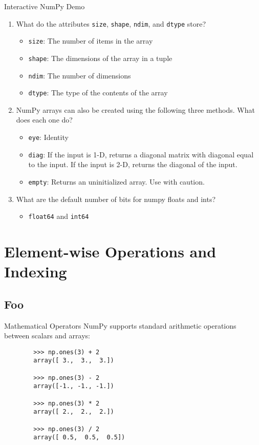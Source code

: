 \documentclass[serif,xcolor=pdftex,dvipsnames,table,hyperref={bookmarks=false,breaklinks}]{beamer}
\begin{document}
\begin{frame}[t,fragile]{Interactive NumPy Demo}
	\begin{enumerate}[<+->]
		\item What do the attributes \verb|size|, \verb|shape|, \verb|ndim|, and \verb|dtype| store?
		\begin{itemize}[<+->]
			\item \verb|size|: The number of items in the array
			\item \verb|shape|: The dimensions of the array in a tuple
			\item \verb|ndim|: The number of dimensions
			\item \verb|dtype|: The type of the contents of the array
		\end{itemize}
		\item NumPy arrays can also be created using the following three methods. What does each one do?
		\begin{itemize}[<+->]
			\item \verb|eye|: Identity
			\item \verb|diag|: If the input is 1-D, returns a diagonal matrix with diagonal equal to the input. If the input is 2-D, returns the diagonal of the input.
			\item \verb|empty|: Returns an uninitialized array. Use with caution.
		\end{itemize}
		\item What are the default number of bits for numpy floats and ints?
		\begin{itemize}[<+->]
			\item \verb|float64| and \verb|int64|
		\end{itemize}
	\end{enumerate}
\end{frame}

\section{Element-wise Operations and Indexing}
\subsection{Foo}

\begin{frame}[t,fragile]{Mathematical Operators}
	NumPy supports standard arithmetic operations between scalars and arrays:
	
	\pause
	\begin{lstlisting}
		>>> np.ones(3) + 2
		array([ 3.,  3.,  3.])
		
		>>> np.ones(3) - 2
		array([-1., -1., -1.])
		
		>>> np.ones(3) * 2
		array([ 2.,  2.,  2.])
		
		>>> np.ones(3) / 2
		array([ 0.5,  0.5,  0.5])
	\end{lstlisting}
\end{frame}
\end{document}
